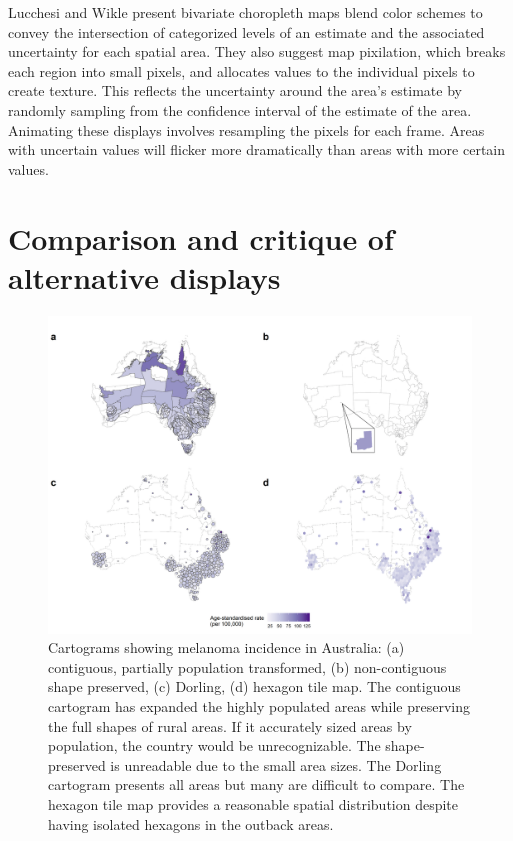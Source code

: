 \documentclass{monashthesis}
\begin{document}
Lucchesi and Wikle \autocite{VUADBC} present bivariate choropleth maps blend color schemes to convey the intersection of categorized levels of an estimate and the associated uncertainty for each spatial area. They also suggest map pixilation, which breaks each region into small pixels, and allocates values to the individual pixels to create texture. This reflects the uncertainty around the area's estimate by randomly sampling from the confidence interval of the estimate of the area. Animating these displays involves resampling the pixels for each frame. Areas with uncertain values will flicker more dramatically than areas with more certain values.

\hypertarget{comparison-and-critique-of-alternative-displays}{%
\section{Comparison and critique of alternative displays}\label{comparison-and-critique-of-alternative-displays}}

\begin{Shaded}
\begin{Highlighting}[]
\OperatorTok{::}\NormalTok{(}\NormalTok{)}
\end{Highlighting}
\end{Shaded}

\begin{figure}
\includegraphics[width=50in]{figures/02-literature/auscartograms} \caption{ Cartograms showing melanoma incidence in Australia: (a) contiguous, partially population transformed, (b) non-contiguous shape preserved, (c) Dorling, (d) hexagon tile map. The contiguous cartogram has expanded the highly populated areas while preserving the full shapes of rural areas. If it accurately sized areas by population, the country would be unrecognizable. The shape-preserved is unreadable due to the small area sizes. The Dorling cartogram presents all areas but many are difficult to compare. The hexagon tile map provides a reasonable spatial distribution despite having isolated hexagons in the outback areas.}\label{fig:auscartograms}
\end{figure}
\end{document}
